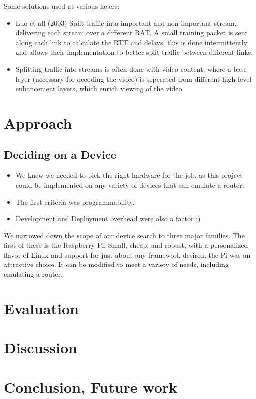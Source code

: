 \documentclass[12pt]{article}
\begin{document}
		Some solutions used at various layers:
		\begin{itemize}
			\item Luo et all (2003) Split traffic into important and non-important stream, delivering each stream over a different RAT. A small training packet is sent along each link to calculate the RTT and delays, this is done intermittently and allows their implementation to better split traffic between different links.
			\item Splitting traffic into streams is often done with video content, where a base layer (necessary for decoding the video) is seperated from different high level enhancement layers, which enrich viewing of the video.

		\end{itemize}

\section{Approach}

	\subsection{Deciding on a Device}
		\begin{itemize}
			\item We knew we needed to pick the right hardware for the job, as this project could be implemented on any variety of devices that can emulate a router.
			\item The first criteria was programmability.
			\item Development and Deployment overhead were also a factor ;)
		\end{itemize}

		We narrowed down the scope of our device search to three major families. The first of these is the Raspberry Pi. Small, cheap, and robust, with a personalized flavor of Linux and support for just about any framework desired, the Pi was an attractive choice. It can be modified to meet a variety of needs, including emulating a router. 

\section{Evaluation}


\section{Discussion}


\section{Conclusion, Future work}


\listoftodos
\end{document}
